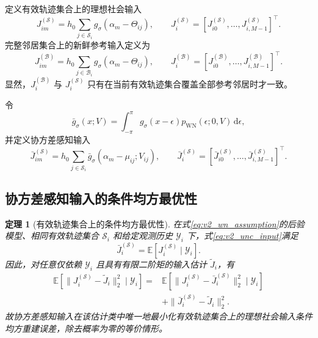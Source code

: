 \documentclass[UTF8,fontset=windows,11pt]{ctexart}
\theoremstyle{cnplain}
\newtheorem{theorem}{定理}[section]
\numberwithin{equation}{section}
\newcommand{\E}{\mathbb E}
\begin{document}
定义有效轨迹集合上的理想社会输入
\begin{equation}
 J_{im}^{(\mathcal S)}=h_0\sum_{j\in\mathcal S_i}g_\sigma(\alpha_m-\Theta_{ij}),
 \qquad
 J_i^{(\mathcal S)}=[J_{i0}^{(\mathcal S)},\ldots,J_{i,M-1}^{(\mathcal S)}]^{\top}.
 \label{eq:v2_tracked_ideal}
\end{equation}
完整邻居集合上的新鲜参考输入定义为
\begin{equation}
 J_{im}^{(\mathcal B)}=h_0\sum_{j\in\mathcal B_i}g_\sigma(\alpha_m-\Theta_{ij}),
 \qquad
 J_i^{(\mathcal B)}=[J_{i0}^{(\mathcal B)},\ldots,J_{i,M-1}^{(\mathcal B)}]^{\top}.
 \label{eq:v2_full_ideal}
\end{equation}
显然，$J_i^{(\mathcal B)}$ 与 $J_i^{(\mathcal S)}$ 只有在当前有效轨迹集合覆盖全部参考邻居时才一致。

令
\begin{equation}
 \bar g_\sigma(x;V)=\int_{-\pi}^{\pi}g_\sigma(x-\epsilon)
 p_{\operatorname{WN}}(\epsilon;0,V)\,\mathrm d\epsilon,
 \label{eq:v2_conv_kernel}
\end{equation}
并定义协方差感知输入
\begin{equation}
 \bar J_{im}^{(\mathcal S)}=h_0\sum_{j\in\mathcal S_i}
 \bar g_\sigma(\alpha_m-\mu_{ij};V_{ij}),
 \qquad
 \bar J_i^{(\mathcal S)}=[\bar J_{i0}^{(\mathcal S)},\ldots,\bar J_{i,M-1}^{(\mathcal S)}]^{\top}.
 \label{eq:v2_unc_input}
\end{equation}

\subsection{协方差感知输入的条件均方最优性}

\begin{theorem}[有效轨迹集合上的条件均方最优性]
\label{thm:v2_mmse}
在式\eqref{eq:v2_wn_assumption}的后验模型、相同有效轨迹集合 $\mathcal S_i$ 和给定观测历史 $\mathcal Y_i$ 下，式\eqref{eq:v2_unc_input}满足
\begin{equation}
 \bar J_i^{(\mathcal S)}=\E[J_i^{(\mathcal S)}\mid\mathcal Y_i].
 \label{eq:v2_conditional_mean}
\end{equation}
因此，对任意仅依赖 $\mathcal Y_i$ 且具有有限二阶矩的输入估计 $\widetilde J_i$，有
\begin{equation}
 \begin{aligned}
 \E[\|J_i^{(\mathcal S)}-\widetilde J_i\|_2^2\mid\mathcal Y_i]
 ={}&\E[\|J_i^{(\mathcal S)}-\bar J_i^{(\mathcal S)}\|_2^2\mid\mathcal Y_i]\\
 &+\|\bar J_i^{(\mathcal S)}-\widetilde J_i\|_2^2.
 \end{aligned}
 \label{eq:v2_orthogonal_projection}
\end{equation}
故协方差感知输入在该估计类中唯一地最小化有效轨迹集合上的理想社会输入条件均方重建误差，除去概率为零的等价情形。
\end{theorem}
\end{document}
